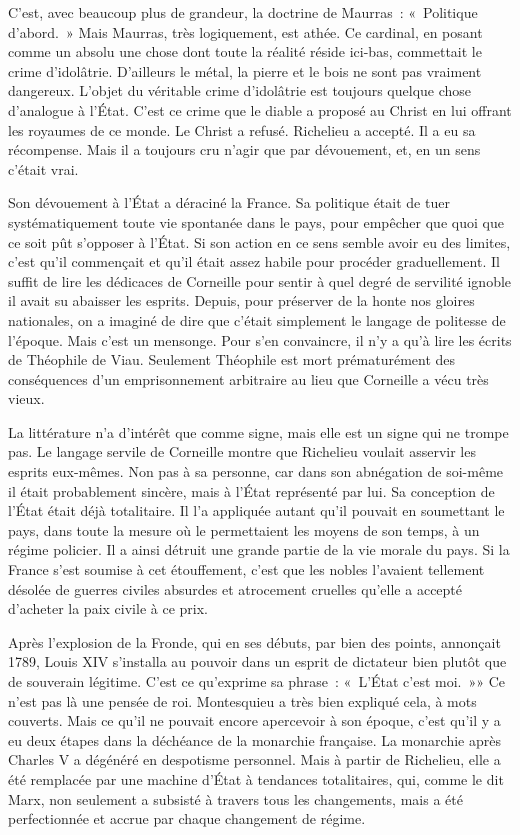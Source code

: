 \documentclass[french,twoside]{book} %
\begin{document}
C'est, avec beaucoup plus de grandeur, la doctrine de Maurras : « Politique d'abord. » Mais Maurras, très logiquement, est athée. Ce cardinal, en posant comme un absolu une chose dont toute la réalité réside ici-bas, commettait le crime d'idolâtrie. D'ailleurs le métal, la pierre et le bois ne sont pas vraiment dangereux. L'objet du véritable crime d'idolâtrie est toujours quelque chose d'analogue à l'État. C'est ce crime que le diable a proposé au Christ en lui offrant les royaumes de ce monde. Le Christ a refusé. Richelieu a accepté. Il a eu sa récompense. Mais il a toujours cru n'agir que par dévouement, et, en un sens c'était vrai.\par
Son dévouement à l'État a déraciné la France. Sa politique était de tuer systématiquement toute vie spontanée dans le pays, pour empêcher que quoi que ce soit pût s’opposer à l'État. Si son action en ce sens semble avoir eu des limites, c'est qu'il commençait et qu'il était assez habile pour procéder graduellement. Il suffit de lire les dédicaces de Corneille pour sentir à quel degré de servilité ignoble il avait su abaisser les esprits. Depuis, pour préserver de la honte nos gloires nationales, on a imaginé de dire que c'était simplement le langage de politesse de l'époque. Mais c'est un mensonge. Pour s'en convaincre, il n'y a qu'à lire les écrits de Théophile de Viau. Seulement Théophile est mort prématurément des conséquences d'un emprisonnement arbitraire au lieu que Corneille a vécu très vieux.\par
La littérature n'a d'intérêt que comme signe, mais elle est un signe qui ne trompe pas. Le langage servile de Corneille montre que Richelieu voulait asservir les esprits eux-mêmes. Non pas à sa personne, car dans son abnégation de soi-même il était probablement sincère, mais à l'État représenté par lui. Sa conception de l'État était déjà totalitaire. Il l'a appliquée autant qu'il pouvait en soumettant le pays, dans toute la mesure où le permettaient les moyens de son temps, à un régime policier. Il a ainsi détruit une grande partie de la vie morale du pays. Si la France s'est soumise à cet étouffement, c'est que les nobles l'avaient tellement désolée de guerres civiles absurdes et atrocement cruelles qu'elle a accepté d'acheter la paix civile à ce prix.\par
Après l'explosion de la Fronde, qui en ses débuts, par bien des points, annonçait 1789, Louis XIV s'installa au pouvoir dans un esprit de dictateur bien plutôt que de souverain légitime. C'est ce qu'exprime sa phrase : « L'État c'est moi. »» Ce n'est pas là une pensée de roi. Montesquieu a très bien expliqué cela, à mots couverts. Mais ce qu'il ne pouvait encore apercevoir à son époque, c'est qu'il y a eu deux étapes dans la déchéance de la monarchie française. La monarchie après Charles V a dégénéré en despotisme personnel. Mais à partir de Richelieu, elle a été remplacée par une machine d'État à tendances totalitaires, qui, comme le dit Marx, non seulement a subsisté à travers tous les changements, mais a été perfectionnée et accrue par chaque changement de régime.\par
\end{document}
